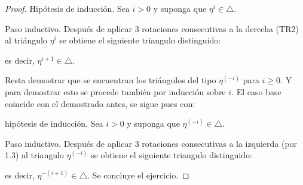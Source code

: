 \documentclass{article}
\begin{document}
\begin{enumerate}
\begin{proof}
Hipótesis de inducción. Sea $i>0$ y suponga que $\eta^{i}\in \triangle$.

Paso inductivo. Después de aplicar 3 rotaciones consecutivas a la derecha (TR2) al tri\'angulo $\eta^{i}$ se obtiene el siguiente triangulo distinguido:

\begin{center}
\end{center}
es decir, $\eta^{i+1}\in \triangle$.

\bigskip

Resta demostrar que se encuentran los triángulos del tipo $\eta^{(-i)}$ para $i\geq 0$. Y para demostrar esto se procede también por inducción sobre $i$. El caso base coincide con el demostrado antes, se sigue pues con:  

\bigskip

hipótesis de inducción. Sea $i>0$ y suponga que $\eta^{(-i)}\in \triangle$. 

\bigskip

Paso inductivo. Después de aplicar 3 rotaciones consecutivas a la izquierda (por 1.3) al triangulo $\eta^{(-i)}$ se obtiene el siguiente triangulo distinguido:

\begin{center}
\end{center}
es decir, $\eta^{-(i+1)}\in \triangle$. Se concluye el ejercicio.
\end{proof}



\end{enumerate}
\end{document}
